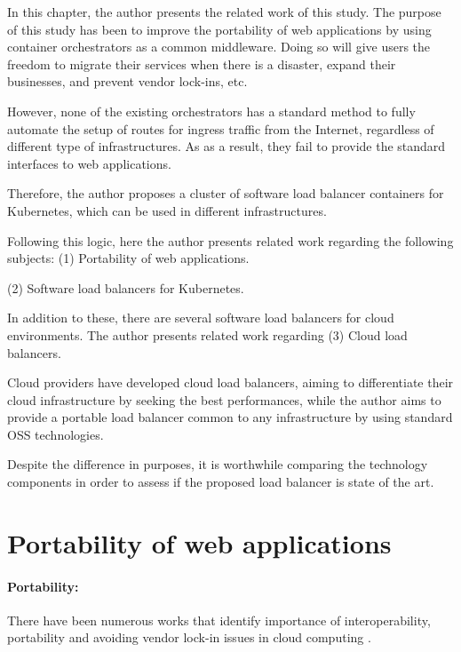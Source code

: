 In this chapter, the author presents the related work of this study.
The purpose of this study has been to improve the portability of web applications by using container orchestrators as a common middleware.
Doing so will give users the freedom to migrate their services when there is a disaster, expand their businesses, and prevent vendor lock-ins, etc.

However, none of the existing orchestrators has a standard method to fully automate the setup of routes for ingress traffic from the Internet, regardless of different type of infrastructures.
As as a result, they fail to provide the standard interfaces to web applications.


Therefore, the author proposes a cluster of software load balancer containers for Kubernetes, which can be used in different infrastructures.

Following this logic, here the author presents related work regarding the following subjects:
(1) Portability of web applications.

(2) Software load balancers for Kubernetes.


%

In addition to these, there are several software load balancers for cloud environments.
The author presents related work regarding (3) Cloud load balancers.





Cloud providers have developed cloud load balancers, aiming to differentiate their cloud infrastructure by seeking the best performances, while the author aims to provide a portable load balancer common to any infrastructure by using standard OSS technologies.

Despite the difference in purposes, it is worthwhile comparing the technology components in order to assess if the proposed load balancer is state of the art.




\section{Portability of web applications}

\paragraph{\bf Portability:}

There have been numerous works that identify importance of interoperability, portability and avoiding vendor lock-in issues in cloud computing \cite{kratzke2016clouns,opara2014critical,opara2016critical,mansour2016interoperability,kaur2017interoperability,kaur2017interoperability,di2015cloud}.


